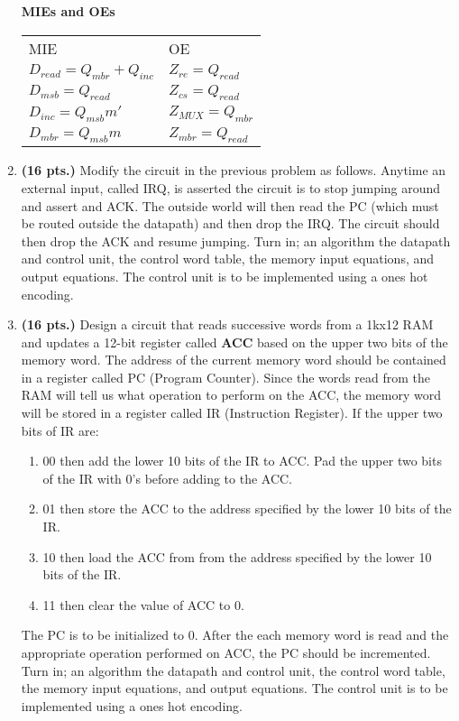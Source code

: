 \begin{enumerate}
\begin{onlysolution}
{\textbf{ MIEs and OEs}

\begin{tabular}{ll}
MIE					&	OE			\\
$D_{read}= Q_{mbr}+Q_{inc}$		&  $Z_{re} = Q_{read}$		\\
$D_{msb} = Q_{read}$			&  $Z_{cs} = Q_{read}$		\\
$D_{inc}= Q_{msb} m'$			&  $Z_{MUX} = Q_{mbr}$		\\
$D_{mbr}= Q_{msb} m$			&  $Z_{mbr} = Q_{read}$		\\
\end{tabular}

} \end{onlysolution} 


\item \textbf{ (16 pts.)}
Modify the circuit in the previous problem as follows.  Anytime
an external input, called IRQ, is asserted the circuit is to stop
jumping around and assert and ACK.  The outside world will then read
the PC (which must be routed outside the datapath) and then drop the 
IRQ.  The circuit should then drop the ACK and resume jumping.
Turn in; an algorithm the datapath and control unit, the control word 
table, the memory input equations, and output equations.  
The control unit is to be implemented using a ones hot encoding.


\item  \textbf{ (16 pts.)} Design a circuit that reads successive words from 
a 1kx12 RAM and
updates a 12-bit register called \textbf{ ACC} based on the upper two bits of the 
memory word.  The address of the current memory word should be contained
in a register called PC (Program Counter).  Since the words read from the
RAM will tell us what operation to perform on the ACC, the memory word will
be stored in a register called IR (Instruction Register).  If the upper
two bits of IR are:
\begin{enumerate}
\item  00 then add the lower 10 bits of the IR to ACC.  Pad the upper two
    bits of the IR with 0's before adding to the ACC.
\item  01 then store the ACC to the address specified by the 
    lower 10 bits of the IR.
\item  10 then load the ACC from from the address specified by the lower 
    10 bits of the IR.
\item  11 then clear the value of ACC to 0.
\end{enumerate}

The PC is to be initialized to 0.  After the each memory word is read
and the appropriate operation performed on ACC, the PC should be
incremented.
Turn in; an algorithm the datapath and control unit, the control word 
table, the memory input equations, and output equations.  
The control unit is to be implemented using a ones hot encoding.



\end{enumerate}
